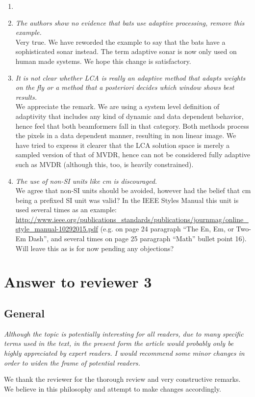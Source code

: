 \documentclass[11pt]{article} %
\newcommand\1{\vec 1}
\newcommand\q[1]{\textit{#1}}
\newcommand\qi[1]{\item\q{#1}}
\newcommand\hi[1]{\item[\textbf{#1}]}
\newcommand\ans[1]{#1}
\newcommand\ai[1]{\\[.5\baselineskip]\ans{#1}}
\begin{document}
\begin{enumerate}
\hi{Introduction}
\qi{The authors show no evidence that bats use adaptive processing, remove this example.}
\ai{Very true. We have reworded the example to say that the bats have a sophisticated sonar instead. The term adaptive sonar is now only used on human made systems. We hope this change is satisfactory. }
%
\qi{It is not clear whether LCA is really an adaptive method that adapts weights on the fly or a method that a posteriori decides which window shows best results.}
\ai{We appreciate the remark. We are using a system level definition of adaptivity that includes any kind of dynamic and data dependent behavior, hence feel that both beamformers fall in that category. Both methods process the pixels in a data dependent manner, resulting in non linear image. We have tried to express it clearer that the LCA solution space is merely a sampled version of that of MVDR, hence can not be considered fully adaptive such as MVDR (although this, too, is heavily constrained).}
%
\qi{The use of non-SI units like cm is discouraged.}
\ai{We agree that non-SI units should be avoided, however had the belief that cm being a prefixed SI unit was valid? In the IEEE Styles Manual this unit is used several times as an example: 
\url{http://www.ieee.org/publications_standards/publications/journmag/online_style_manual-10292015.pdf} (e.g. on page 24 paragraph ``The En, Em, or Two-Em Dash'', and several times on page 25 paragraph ``Math'' bullet point 16). Will leave this as is for now pending any objections?}
%
\end{enumerate}


\newpage
\section{Answer to reviewer 3}

\subsection*{General}

\q{Although the topic is potentially interesting for all readers, due to many specific terms used in the text, in the present form the article would probably only be highly appreciated by expert readers. I would recommend some minor changes in order to widen the frame of potential readers.}

\ans{We thank the reviewer for the thorough review and very constructive remarks. We believe in this philosophy and attempt to make changes accordingly.}
\end{document}
